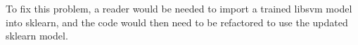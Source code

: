 \documentclass[10pt,a4paper]{article}
\begin{document}
        To fix this problem, a reader would be needed to import a trained libsvm model into sklearn, and the code would then need to be refactored to use the updated sklearn model. 


            

\end{document}

